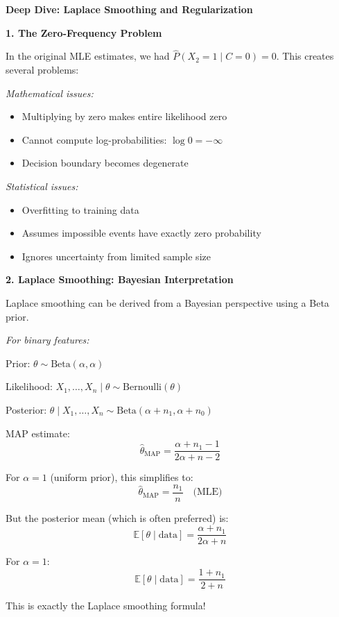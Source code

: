 \documentclass[12pt]{article}
\begin{document}
\begin{explanation}
\textbf{Deep Dive: Laplace Smoothing and Regularization}

\textbf{1. The Zero-Frequency Problem}

In the original MLE estimates, we had $\hat{P}(X_2 = 1 \mid C = 0) = 0$. This creates several problems:

\textit{Mathematical issues:}
\begin{itemize}
    \item Multiplying by zero makes entire likelihood zero
    \item Cannot compute log-probabilities: $\log 0 = -\infty$
    \item Decision boundary becomes degenerate
\end{itemize}

\textit{Statistical issues:}
\begin{itemize}
    \item Overfitting to training data
    \item Assumes impossible events have exactly zero probability
    \item Ignores uncertainty from limited sample size
\end{itemize}

\textbf{2. Laplace Smoothing: Bayesian Interpretation}

Laplace smoothing can be derived from a Bayesian perspective using a Beta prior.

\textit{For binary features:}

Prior: $\theta \sim \text{Beta}(\alpha, \alpha)$

Likelihood: $X_1, \ldots, X_n \mid \theta \sim \text{Bernoulli}(\theta)$

Posterior: $\theta \mid X_1, \ldots, X_n \sim \text{Beta}(\alpha + n_1, \alpha + n_0)$

MAP estimate:
\[
\hat{\theta}_{\text{MAP}} = \frac{\alpha + n_1 - 1}{2\alpha + n - 2}
\]

For $\alpha = 1$ (uniform prior), this simplifies to:
\[
\hat{\theta}_{\text{MAP}} = \frac{n_1}{n} \quad \text{(MLE)}
\]

But the posterior mean (which is often preferred) is:
\[
\mathbb{E}[\theta \mid \text{data}] = \frac{\alpha + n_1}{2\alpha + n}
\]

For $\alpha = 1$:
\[
\mathbb{E}[\theta \mid \text{data}] = \frac{1 + n_1}{2 + n}
\]

This is exactly the Laplace smoothing formula!


\end{explanation}
\end{document}
